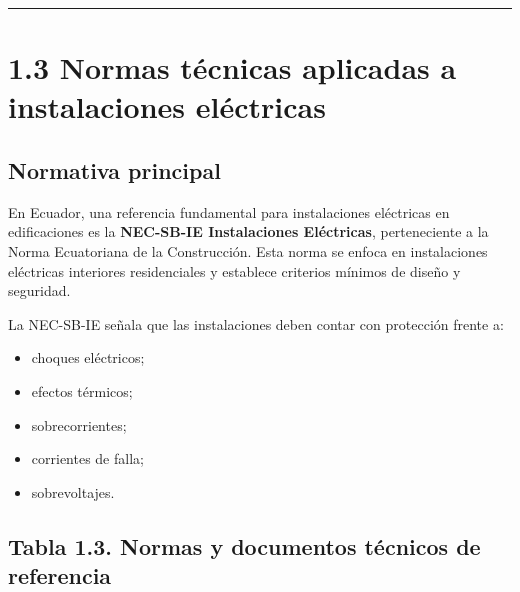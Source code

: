 \documentclass[
  spanish,
  letterpaper,
  DIV=11,
  numbers=noendperiod]{scrreprt}
\providecommand{\tightlist}{%
  \setlength{\itemsep}{0pt}\setlength{\parskip}{0pt}}
\begin{document}
\begin{center}\rule{0.5\linewidth}{0.5pt}\end{center}

\section{1.3 Normas técnicas aplicadas a instalaciones
eléctricas}\label{normas-tuxe9cnicas-aplicadas-a-instalaciones-eluxe9ctricas}

\subsection{Normativa principal}\label{normativa-principal}

En Ecuador, una referencia fundamental para instalaciones eléctricas en
edificaciones es la \textbf{NEC-SB-IE Instalaciones Eléctricas},
perteneciente a la Norma Ecuatoriana de la Construcción. Esta norma se
enfoca en instalaciones eléctricas interiores residenciales y establece
criterios mínimos de diseño y seguridad.

La NEC-SB-IE señala que las instalaciones deben contar con protección
frente a:

\begin{itemize}
\tightlist
\item
  choques eléctricos;
\item
  efectos térmicos;
\item
  sobrecorrientes;
\item
  corrientes de falla;
\item
  sobrevoltajes.
\end{itemize}

\subsection{Tabla 1.3. Normas y documentos técnicos de
referencia}\label{tabla-1.3.-normas-y-documentos-tuxe9cnicos-de-referencia}
\end{document}

